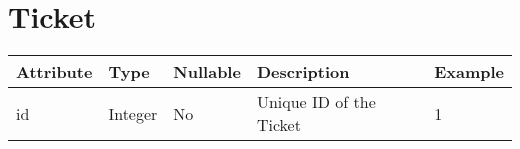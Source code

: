 \section{Ticket}

\keepXColumns
\begin{tabularx}{\textwidth}{l l l X l}
  \textbf{Attribute}  & \textbf{Type} & \textbf{Nullable} & \textbf{Description}            & \textbf{Example} \\
  \endhead
  id                  & Integer       & No                & Unique ID of the Ticket         & 1\\
\end{tabularx}
